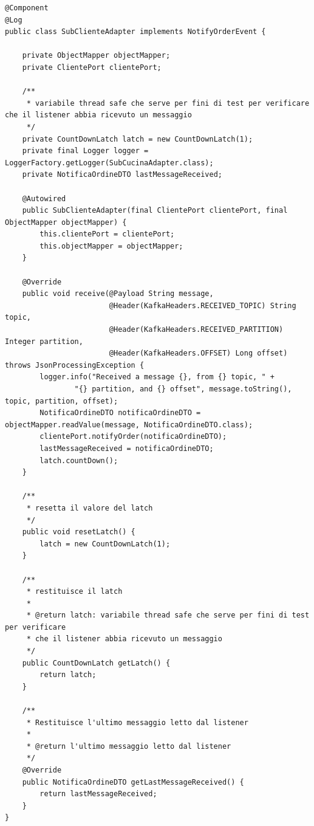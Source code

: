 \begin{lstlisting}[style=myJava, 
    caption={Classe del consumer kafka SubClienteAdapter.java}, label=lst:subclienteadapter, 
    emph={[2] kafkaTemplate , objectMapper, topic, payload, log, producer, embeddedKafka, logger, testAppender, RECEIVED_TOPIC, RECEIVED_PARTITION, OFFSET, clientePort, lastMessageReceived, latch,  },
    emphstyle={[2]\color{codeDarkMagenta}},
    emph={[3] receive, resetLatch, getLatch, getLastMessageReceived },
    emphstyle={[3]\color{codeCyan}}]
@Component
@Log
public class SubClienteAdapter implements NotifyOrderEvent {

    private ObjectMapper objectMapper;
    private ClientePort clientePort;

    /**
     * variabile thread safe che serve per fini di test per verificare che il listener abbia ricevuto un messaggio
     */
    private CountDownLatch latch = new CountDownLatch(1);
    private final Logger logger = LoggerFactory.getLogger(SubCucinaAdapter.class);
    private NotificaOrdineDTO lastMessageReceived;

    @Autowired
    public SubClienteAdapter(final ClientePort clientePort, final ObjectMapper objectMapper) {
        this.clientePort = clientePort;
        this.objectMapper = objectMapper;
    }

    @Override
    public void receive(@Payload String message,
                        @Header(KafkaHeaders.RECEIVED_TOPIC) String topic,
                        @Header(KafkaHeaders.RECEIVED_PARTITION) Integer partition,
                        @Header(KafkaHeaders.OFFSET) Long offset) throws JsonProcessingException {
        logger.info("Received a message {}, from {} topic, " +
                "{} partition, and {} offset", message.toString(), topic, partition, offset);
        NotificaOrdineDTO notificaOrdineDTO = objectMapper.readValue(message, NotificaOrdineDTO.class);
        clientePort.notifyOrder(notificaOrdineDTO);
        lastMessageReceived = notificaOrdineDTO;
        latch.countDown();
    }

    /**
     * resetta il valore del latch
     */
    public void resetLatch() {
        latch = new CountDownLatch(1);
    }

    /**
     * restituisce il latch
     *
     * @return latch: variabile thread safe che serve per fini di test per verificare
     * che il listener abbia ricevuto un messaggio
     */
    public CountDownLatch getLatch() {
        return latch;
    }

    /**
     * Restituisce l'ultimo messaggio letto dal listener
     *
     * @return l'ultimo messaggio letto dal listener
     */
    @Override
    public NotificaOrdineDTO getLastMessageReceived() {
        return lastMessageReceived;
    }
}
\end{lstlisting}
